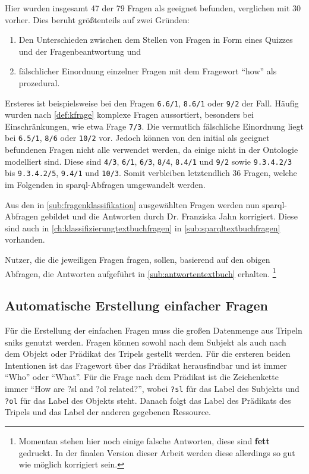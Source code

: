 Hier wurden insgesamt 47 der 79 Fragen als geeignet befunden, verglichen mit 30 vorher.
Dies beruht größtenteils auf zwei Gründen:
\begin{enumerate}
  \item Den Unterschieden zwischen dem Stellen von Fragen in Form eines Quizzes und der Fragenbeantwortung und
  \item fälschlicher Einordnung einzelner Fragen mit dem Fragewort \enquote{how} als prozedural.
\end{enumerate}
Ersteres ist beispielsweise bei den Fragen \texttt{6.6/1}, \texttt{8.6/1} oder \texttt{9/2} der Fall.
Häufig wurden nach \cref{def:kfrage} komplexe Fragen aussortiert, besonders bei Einschränkungen, wie etwa Frage \texttt{7/3}.
Die vermutlich fälschliche Einordnung liegt bei \texttt{6.5/1}, \texttt{8/6} oder \texttt{10/2} vor.
Jedoch können von den initial als geeignet befundenen Fragen nicht alle verwendet werden, da einige nicht in der Ontologie modelliert sind.
Diese sind \texttt{4/3}, \texttt{6/1}, \texttt{6/3}, \texttt{8/4}, \texttt{8.4/1} und \texttt{9/2} sowie \texttt{9.3.4.2/3} bis \texttt{9.3.4.2/5}, \texttt{9.4/1} und \texttt{10/3}.
Somit verbleiben letztendlich 36 Fragen, welche im Folgenden in \ac{sparql}-Abfragen umgewandelt werden.

Aus den in \cref{sub:fragenklassifikation} ausgewählten Fragen werden nun \ac{sparql}-Abfragen gebildet
und die Antworten durch Dr. Franziska Jahn korrigiert.
Diese sind auch in \cref{ch:klassifizierungtextbuchfragen} in \cref{sub:sparqltextbuchfragen} vorhanden.

Nutzer, die die jeweiligen Fragen fragen, sollen, basierend auf den obigen Abfragen, die Antworten aufgeführt in \cref{sub:antwortentextbuch} erhalten.
\footnote{Momentan stehen hier noch einige falsche Antworten, diese sind \textbf{fett} gedruckt.
In der finalen Version dieser Arbeit werden diese allerdings so gut wie möglich korrigiert sein.}

\subsection{Automatische Erstellung einfacher Fragen}

Für die Erstellung der einfachen Fragen muss die großen Datenmenge aus Tripeln \ac{snik}s genutzt werden.
Fragen können sowohl nach dem Subjekt als auch nach dem Objekt oder Prädikat des Tripels gestellt werden.
Für die ersteren beiden Intentionen ist das Fragewort über das Prädikat herausfindbar und ist immer \enquote{Who} oder \enquote{What}.
Für die Frage nach dem Prädikat ist die Zeichenkette immer \enquote{How are ?sl and ?ol related?}, wobei \texttt{?sl} für das Label des Subjekts und \texttt{?ol} für das Label des Objekts steht.
Danach folgt das Label des Prädikats des Tripels und das Label der anderen gegebenen Ressource.

